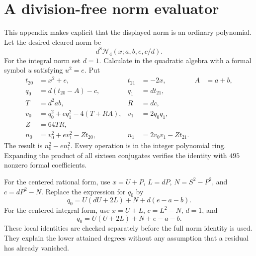 \documentclass[11pt]{article}
\newcommand{\NN}{\mathcal N_4}\newcommand{\PP}{\mathcal P}
\theoremstyle{definition}\newtheorem{definition}[theorem]{Definition}
\theoremstyle{remark}\newtheorem{remark}[theorem]{Remark}
\begin{document}
\section{A division-free norm evaluator}\label{app:norm}
This appendix makes explicit that the displayed norm is an ordinary
polynomial. Let the desired cleared norm be
\[
 d^8\NN(x;a,b,e,c/d).
\]
For the integral norm set $d=1$. Calculate in the quadratic algebra with
a formal symbol $u$ satisfying $u^2=e$. Put
\begin{align*}
 t_{20}&=x^2+e,&t_{21}&=-2x,&A&=a+b,\\
 q_0&=d(t_{20}-A)-c,&q_1&=dt_{21},\\
 T&=d^2ab,&R&=dc,\\
 v_0&=q_0^2+e q_1^2-4(T+RA),&v_1&=2q_0q_1,\\
 Z&=64TR,\\
 n_0&=v_0^2+e v_1^2-Zt_{20},&n_1&=2v_0v_1-Zt_{21}.
\end{align*}
The result is $n_0^2-e n_1^2$. Every operation is in the integer
polynomial ring. Expanding the product of all sixteen conjugates verifies
the identity with $495$ nonzero formal coefficients.

For the centered rational form, use $x=U+P$, $L=dP$,
$N=S^2-P^2$, and $c=dP^2-N$. Replace the expression for $q_0$ by
\[
 q_0=U(dU+2L)+N+d(e-a-b).
\]
For the centered integral form, use $x=U+L$, $c=L^2-N$, $d=1$, and
\[
 q_0=U(U+2L)+N+e-a-b.
\]
These local identities are checked separately before the full norm
identity is used. They explain the lower attained degrees without any
assumption that a residual has already vanished.
\end{document}
